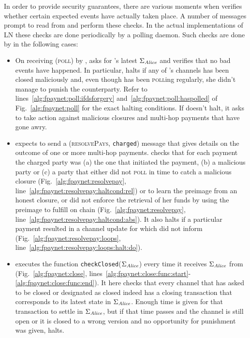   In order to provide security guarantees, there are various moments when
  \fpaynet{} verifies whether certain expected events have actually taken place.
  A number of messages prompt \fpaynet{} to read from \ledger{} and perform
  these checks. In the actual implementations of LN these checks are done
  periodically by a polling daemon. Such checks are done by \fpaynet{} in the
  following cases:
  \begin{itemize}
    \item On receiving (\textsc{poll}) by \alice, \fpaynet{} asks \ledger{} for
    \alice's latest $\Sigma_{\mathit{Alice}}$ and verifies that no bad events have
    happened. In particular, \fpaynet{} halts if any of \alice's channels has
    been closed maliciously and, even though \alice{} has been \textsc{poll}ing
    regularly, she didn't manage to punish the counterparty. Refer to
    lines~\ref{alg:fpaynet:poll:ifdsforgery}
    and~\ref{alg:fpaynet:poll:haspolled} of Fig.~\ref{alg:fpaynet:poll} for the
    exact halting conditions. If \fpaynet{} doesn't halt, it asks \simulator{}
    to take action against malicious closures and multi-hop payments that have
    gone awry.
    \item \fpaynet{} expects \simulator{} to send a (\textsc{resolvePays},
    \texttt{charged}) message that gives details on the outcome of one or more
    multi-hop payments. \fpaynet{} checks that for each payment the charged
    party was (a) the one that initiated the payment, (b) a malicious party or
    (c) a party that either did not \textsc{poll} in time to catch a malicious
    closure (Fig.~\ref{alg:fpaynet:resolvepay},
    line~\ref{alg:fpaynet:resolvepay:haltcond:rel}) or to learn the preimage
    from an honest closure, or did not enforce the retrieval of her funds by
    using the preimage to fulfill on chain (Fig.~\ref{alg:fpaynet:resolvepay},
    line~\ref{alg:fpaynet:resolvepay:haltcond:abs}). It also halts if a
    particular payment resulted in a channel update for which \simulator{} did
    not inform \fpaynet{} (Fig.~\ref{alg:fpaynet:resolvepay:loops},
    line~\ref{alg:fpaynet:resolvepay:loops:halt:do}).
    \item \fpaynet{} executes the function
    \texttt{checkClosed}($\Sigma_{\mathit{Alice}}$) every time it receives
    $\Sigma_{\mathit{Alice}}$ from \ledger{} (Fig.~\ref{alg:fpaynet:close},
    lines~\ref{alg:fpaynet:close:func:start}-\ref{alg:fpaynet:close:func:end}).
    It here checks that every channel that \environment{} has asked to be closed
    or \simulator{} designated as closed indeed has a closing transaction that
    corresponds to its latest state in $\Sigma_{\mathit{Alice}}$. Enough time is given
    for that transaction to settle in $\Sigma_{\mathit{Alice}}$, but if that time passes
    and the channel is still open or it is closed to a wrong version and no
    opportunity for punishment was given, \fpaynet{} halts.
  \end{itemize}

